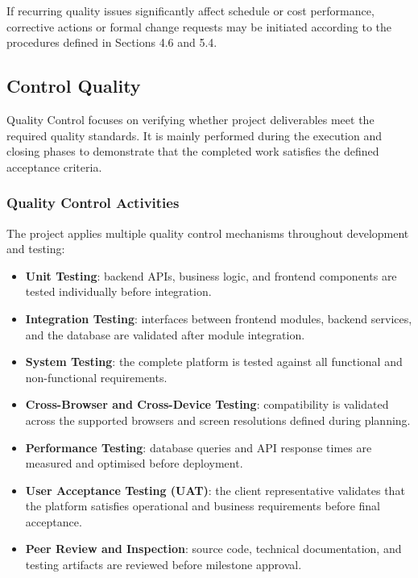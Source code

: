 \documentclass[12pt,a4paper]{article}
\begin{document}
If recurring quality issues significantly affect schedule or cost performance, corrective actions or formal change requests may be initiated according to the procedures defined in Sections 4.6 and 5.4.

\subsection{Control Quality}

Quality Control focuses on verifying whether project deliverables meet the required quality standards. It is mainly performed during the execution and closing phases to demonstrate that the completed work satisfies the defined acceptance criteria.

\subsubsection{Quality Control Activities}

The project applies multiple quality control mechanisms throughout development and testing:

\begin{itemize}[leftmargin=*]
    \item \textbf{Unit Testing}: backend APIs, business logic, and frontend components are tested individually before integration.
    \item \textbf{Integration Testing}: interfaces between frontend modules, backend services, and the database are validated after module integration.
    \item \textbf{System Testing}: the complete platform is tested against all functional and non-functional requirements.
    \item \textbf{Cross-Browser and Cross-Device Testing}: compatibility is validated across the supported browsers and screen resolutions defined during planning.
    \item \textbf{Performance Testing}: database queries and API response times are measured and optimised before deployment.
    \item \textbf{User Acceptance Testing (UAT)}: the client representative validates that the platform satisfies operational and business requirements before final acceptance.
    \item \textbf{Peer Review and Inspection}: source code, technical documentation, and testing artifacts are reviewed before milestone approval.
\end{itemize}
\end{document}
